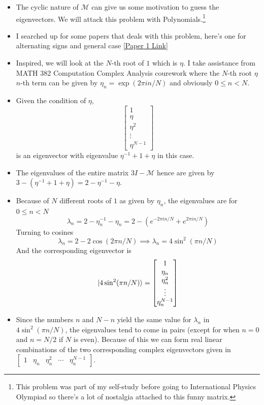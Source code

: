 \documentclass[letter, 10pts]{article}
\begin{document}
\begin{itemize}
	\item The cyclic nature of $\mathcal M$ can give us some motivation to guess the eigenvectors. We will attack this problem with Polynomials.\footnote{This problem was part of my self-study before going to International Physics Olympiad so there's a lot of nostalgia attached to this funny matrix.}
	\item I searched up for some papers that deals with this problem, here's one for alternating signs and general case
\href{https://www.sciencedirect.com/science/article/pii/S0024379513005776}{[Paper 1 Link]} 
\item Inspired, we will look at the $N$-th root of $1$ which is $\eta.$ I take assistance from MATH 382 Computation Complex Analysis courework where the $N$-th root $\eta$ $n$-th term can be given by $\eta_n = \exp(2 \pi i n / N)$ and obviously $0 \le n < N$. 
\item Given the condition of $\eta$, \[
\begin{bmatrix} 1 \\ \eta \\ \eta^2 \\ \vdots \\ \eta^{N-1} \end{bmatrix} 
\] is an eigenvector with eigenvalue $\eta ^{-1} + 1 + \eta $ in this case.  
\item The eigenvalues of the entire matrix $3 I - \mathcal M$ hence are given by  $3 - (\eta ^{-1} + 1 + \eta ) = 2 - \eta^{-1} - \eta$. 
\item Because of $N$ different roots of $1$ as given by $\eta_n$, the eigenvalues are for $0 \le n < N$ 
	\[
	\lambda_n = 2 - \eta^{-1}_n - \eta_n = 2 - \left(e^{- 2 \pi i n / N} + e^{ 2 \pi i n / N}\right)
	\]
	Turning to cosines 
	\[
	\lambda_n = 2 - 2 \cos (2 \pi n / N ) \implies \lambda_n = 4 \sin ^2 (\pi n / N )
	\]
	And the corresponding eigenvector is 
	\[ \ket{4 \sin ^2 (\pi n / N)} = 
	\begin{bmatrix} 1 \\ \eta_n \\ \eta^2_n \\ \vdots \\ \eta^{N-1}_n  \end{bmatrix} 
	\] 
\item Since the numbers $n$ and $N-n$ yield the same value for $\lambda_n$ in $4 \sin ^2 (\pi n / N)$, the eigenvalues tend to come in pairs (except for when $n = 0$ and $n = N / 2$ if $N$ is even). Because of this we can form real linear combinations of the two corresponding complex eigenvectors given in $\begin{bmatrix} 1 & \eta_n & \eta^2_n & \cdots & \eta^{N-1}_n  \end{bmatrix} $. 


\end{itemize}
\end{document}
